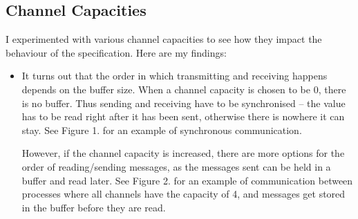 \documentclass{report}
\newcommand{\tab}{\hspace*{3em}}
\begin{document}
\subsection*{Channel Capacities}
\tab I experimented with various channel capacities to see how they impact the behaviour of the specification. Here are my findings:
\begin{itemize}
\item It turns out that the order in which transmitting and receiving happens depends on the buffer size. When a channel capacity is chosen to be 0, there is no buffer. Thus sending and receiving have to be synchronised -- the value has to be read right after it has been sent, otherwise there is nowhere it can stay. See Figure 1. for an example of synchronous communication.
\par However, if the channel capacity is increased, there are more options for the order of reading/sending messages, as the messages sent can be held in a buffer and read later. See Figure 2. for an example of communication between processes where all channels have the capacity of 4, and messages get stored in the buffer before they are read.


\end{itemize}
\end{document}

